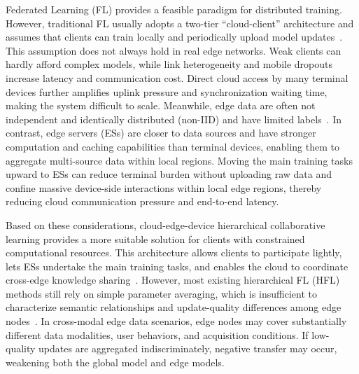 ﻿\documentclass[10pt, conference, letterpaper]{ IEEEtran}
\begin{document}
Federated Learning (FL) provides a feasible paradigm for distributed training. However, traditional FL usually adopts a two-tier ``cloud-client'' architecture and assumes that clients can train locally and periodically upload model updates~\cite{zhang2026source}. This assumption does not always hold in real edge networks. Weak clients can hardly afford complex models, while link heterogeneity and mobile dropouts increase latency and communication cost. Direct cloud access by many terminal devices further amplifies uplink pressure and synchronization waiting time, making the system difficult to scale. Meanwhile, edge data are often not independent and identically distributed (non-IID) and have limited labels~\cite{Xu2026SemiSFL}. In contrast, edge servers (ESs) are closer to data sources and have stronger computation and caching capabilities than terminal devices, enabling them to aggregate multi-source data within local regions. Moving the main training tasks upward to ESs can reduce terminal burden without uploading raw data and confine massive device-side interactions within local edge regions, thereby reducing cloud communication pressure and end-to-end latency.

Based on these considerations, cloud-edge-device hierarchical collaborative learning provides a more suitable solution for clients with constrained computational resources. This architecture allows clients to participate lightly, lets ESs undertake the main training tasks, and enables the cloud to coordinate cross-edge knowledge sharing~\cite{Xu2025Heterogeneous, fu2026differentially}. However, most existing hierarchical FL (HFL) methods still rely on simple parameter averaging, which is insufficient to characterize semantic relationships and update-quality differences among edge nodes~\cite{liu2020client}. In cross-modal edge data scenarios, edge nodes may cover substantially different data modalities, user behaviors, and acquisition conditions. If low-quality updates are aggregated indiscriminately, negative transfer may occur, weakening both the global model and edge models.
\end{document}
